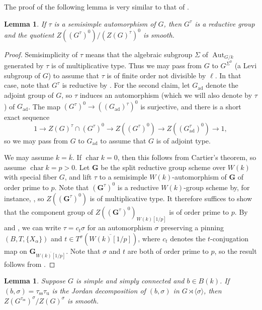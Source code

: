 \documentclass[11pt,reqno]{amsart}
\newtheorem{lemma}[theorem]{Lemma}
\theoremstyle{definition}
\renewcommand{\rm}{\mathrm}
\newcommand{\bG}{{\mathbf G}}
\DeclareMathOperator{\Aut}{Aut}
\DeclareMathOperator{\chara}{char}
\newcommand{\ov}[1]{\overline{#1}}
\begin{document}
The proof of the following lemma is very similar to that of \cite[Lemma 3.11]{DHKM}.

\begin{lemma}\label{lemma:smooth-center-ss}
    If $\tau$ is a semisimple automorphism of $G$, then $G^\tau$ is a reductive group and the quotient $Z((G^\tau)^0)/(Z(G)^\tau)^0$ is smooth.
\end{lemma}

\begin{proof}
    Semisimplicity of $\tau$ means that the algebraic subgroup $\Sigma$ of $\Aut_{G/k}$ generated by $\tau$ is of multiplicative type. Thus we may pass from $G$ to $G^{\Sigma^0}$ (a Levi subgroup of $G$) to assume that $\tau$ is of finite order not divisible by $\ell$. In that case, note that $G^\tau$ is reductive by \cite[Theorem 2.1]{Prasad-Yu-finite}. For the second claim, let $G_{\rm{ad}}$ denote the adjoint group of $G$, so $\tau$ induces an automorphism (which we will also denote by $\tau$) of $G_{\rm{ad}}$. The map $(G^\tau)^0 \to ((G_{\rm{ad}})^\tau)^0$ is surjective, and there is a short exact sequence
    \[
    1 \to Z(G)^\tau \cap (G^\tau)^0 \to Z((G^\tau)^0) \to Z((G_{\rm{ad}}^\tau)^0) \to 1,
    \]
    so we may pass from $G$ to $G_{\rm{ad}}$ to assume that $G$ is of adjoint type.

    We may assume $k = \ov{k}$. If $\chara k = 0$, then this follows from Cartier's theorem, so assume $\chara k = p > 0$. Let $\bG$ be the split reductive group scheme over $W(k)$ with special fiber $G$, and lift $\tau$ to a semisimple $W(k)$-automorphism of $\bG$ of order prime to $p$. Note that $(\bG^\tau)^0$ is a reductive $W(k)$-group scheme by, for instance, \cite[Corollary 3.7]{Booher-Tang}, so $Z((\bG^\tau)^0)$ is of multiplicative type. It therefore suffices to show that the component group of $Z((\bG^\tau)^0)_{W(k)[1/p]}$ is of order prime to $p$. By \cite[Theorem 7.5]{SteinbergEndomorphisms} and \cite[Lemma 5]{Springer-twisted}, we can write $\tau = c_t\sigma$ for an automorphism $\sigma$ preserving a pinning $(B, T, \{X_\alpha\})$ and $t \in T^\sigma(\ov{W(k)[1/p]})$, where $c_t$ denotes the $t$-conjugation map on $\bG_{\ov{W(k)[1/p]}}$. Note that $\sigma$ and $t$ are both of order prime to $p$, so the result follows from \cite[Theorem 3.11]{DM-quass}.
\end{proof}

\begin{lemma}\label{lemma:smooth-center-pinning}
    Suppose $G$ is simple and simply connected and $b \in B(k)$. If $(b,\sigma) = \tau_{\rm{ss}} \tau_{\rm{u}}$ is the Jordan decomposition of $(b,\sigma)$ in $G \rtimes \langle \sigma \rangle$, then $Z(G^{\tau_{\rm{ss}}})^{\sigma}/Z(G)^\sigma$ is smooth.
\end{lemma}
\end{document}
